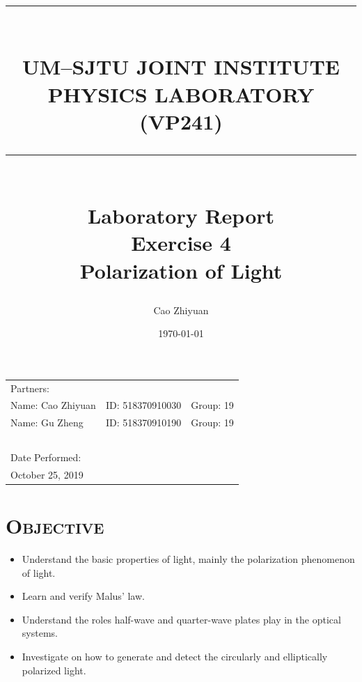 \documentclass[a4paper,12pt]{article}
\title{\rule{\textwidth}{0.3mm} \\UM–SJTU JOINT INSTITUTE \\ PHYSICS LABORATORY \\ (VP241) \\ \rule{\textwidth}{0.3mm} \\ [30 mm]  \Large{Laboratory Report} \\[5 mm]  Exercise 4 \\[1 mm] 
Polarization of Light \\[20 mm]} %
\author{Cao Zhiyuan} %
\date{\today} %
\begin{document}
\scshape

\maketitle %

\begin{center}
\begin{tabular}{l l l}
\\[5 mm]
Partners:  \\
Name: Cao Zhiyuan & ID: 518370910030 & Group: 19 \\
Name: Gu Zheng & ID: 518370910190 & Group: 19 \\
~\\
Date Performed:\\
October 25, 2019\\
\end{tabular}
\end{center}

\thispagestyle{empty}


\newpage


\small\tableofcontents
\thispagestyle{empty}


\newpage

\setcounter{page}{1}
\upshape
\section{\textsc{Objective}}
\begin{itemize}
\item Understand the basic properties of light, mainly the polarization phenomenon of light.
\item Learn and verify Malus' law.
\item Understand the roles half-wave and quarter-wave plates play in the optical systems.
\item Investigate on how to generate and detect the circularly and elliptically polarized light.
\end{itemize}

\end{document}
